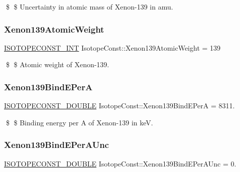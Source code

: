 \$ \$ Uncertainty in atomic mass of Xenon-\/139 in amu. \mbox{\label{group___isotope_const-_xenon-_xe139_ga3913f1e24146ec126a51458e2496ff57}} 
\subsubsection{\texorpdfstring{Xenon139\+Atomic\+Weight}{Xenon139AtomicWeight}}
{\footnotesize\ttfamily \mbox{\hyperlink{group___isotope_const-_macros_ga5f18360b3e99483a35c32d789e62621c}{I\+S\+O\+T\+O\+P\+E\+C\+O\+N\+S\+T\+\_\+\+I\+NT}} Isotope\+Const\+::\+Xenon139\+Atomic\+Weight = 139}

\$ \$ Atomic weight of Xenon-\/139. \mbox{\label{group___isotope_const-_xenon-_xe139_gaf153e0f4bf66ef3b198721009432ec01}} 
\subsubsection{\texorpdfstring{Xenon139\+Bind\+E\+PerA}{Xenon139BindEPerA}}
{\footnotesize\ttfamily \mbox{\hyperlink{group___isotope_const-_macros_ga8f45a7272ce02c0b4c65c44636ed719a}{I\+S\+O\+T\+O\+P\+E\+C\+O\+N\+S\+T\+\_\+\+D\+O\+U\+B\+LE}} Isotope\+Const\+::\+Xenon139\+Bind\+E\+PerA = 8311.}

\$ \$ Binding energy per A of Xenon-\/139 in keV. \mbox{\label{group___isotope_const-_xenon-_xe139_ga9751427a7d018fba9184ad17aa01a265}} 
\subsubsection{\texorpdfstring{Xenon139\+Bind\+E\+Per\+A\+Unc}{Xenon139BindEPerAUnc}}
{\footnotesize\ttfamily \mbox{\hyperlink{group___isotope_const-_macros_ga8f45a7272ce02c0b4c65c44636ed719a}{I\+S\+O\+T\+O\+P\+E\+C\+O\+N\+S\+T\+\_\+\+D\+O\+U\+B\+LE}} Isotope\+Const\+::\+Xenon139\+Bind\+E\+Per\+A\+Unc = 0.}

